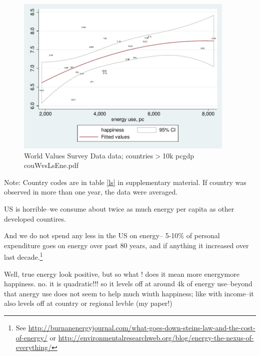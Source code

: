 \documentclass[10pt, letterpaper]{article}
\begin{document}
\begin{spacing}{1.4}
\begin{figure}[H]
 \includegraphics[height=3in]{graphsAndTables/couWvsLsEne.pdf}\centering
\caption{World Values Survey Data data; countries$>$10k pcgdp couWvsLsEne.pdf}\label{couWvsLsEne.pdf}
\end{figure}
{\scriptsize Note: Country codes are in table \ref{ls} in supplementary
  material. If country was observed in more than one year, the data were averaged.}

US is horrible--we consume about twice as much energy per capita as other
developed countires. %

And we do not spend any less in the US on energy-- 5-10\% of personal
expenditure goes on energy over past 80 years, and if anything it increased over
last decade.\footnote{See
  \url{http://burnanenergyjournal.com/what-goes-down-steins-law-and-the-cost-of-energy/}
or \url{http://environmentalresearchweb.org/blog/energy-the-nexus-of-everything/}}


Well, true energy look positive, but so what ! does it mean more energymore
happiness. no. it is quadratic!!! so it levels off at around 4k of energy
use--beyond that anergy use does not seem to help much wiuth happiness; like
with income--it also levels off at country or regional levble (my paper!)


\end{spacing}
\end{document}
